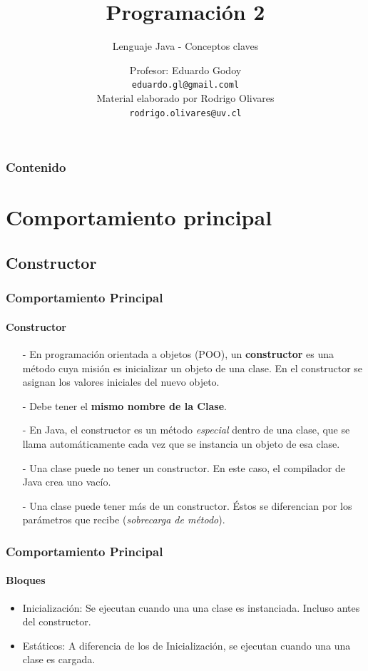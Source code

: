 \documentclass{beamer}
\title[\textbf{Programaci\'on 2}]{\textbf{Programaci\'on 2}}
\subtitle{Lenguaje Java - Conceptos claves}
\author[Eduardo Godoy]
{
	Profesor: Eduardo Godoy \\
	\vspace{0.5mm}
	\texttt{\normalsize eduardo.gl@gmail.coml} \\ 
	Material elaborado por Rodrigo Olivares \\
	\texttt{\normalsize rodrigo.olivares@uv.cl} 
}
\institute[Universidad de Valpara\'iso]
\begin{document}
	\begin{frame}
		\titlepage
	\end{frame}

	\begin{frame}
		\frametitle{Contenido}
		\tableofcontents%
	\end{frame}

    \section{Comportamiento principal}
    
		\subsection{Constructor}

        \begin{frame}
			\frametitle{Comportamiento Principal}
			\framesubtitle{Constructor}

			\begin{block}{}
			    \begin{itemize}
                    \item[-] En programaci\'on orientada a objetos (POO), un \textbf{constructor} es una m\'etodo cuya misi\'on es inicializar un objeto de una clase. En el constructor se asignan los valores iniciales del nuevo objeto.
                    \item[-] Debe tener el \textbf{mismo nombre de la Clase}.
                    \item[-] En Java, el constructor es un m\'etodo \emph{especial} dentro de una clase, que se llama autom\'aticamente cada vez que se instancia un objeto de esa clase.
                    \item[-] Una clase puede no tener un constructor. En este caso, el compilador de Java crea uno vac\'io.
                    \item[-] Una clase puede tener m\'as de un constructor. \'Estos se diferencian por los par\'ametros que recibe (\emph{sobrecarga de m\'etodo}).
                \end{itemize}
			\end{block}
		\end{frame}

        \begin{frame}
			\frametitle{Comportamiento Principal}
			\framesubtitle{Bloques}

			\begin{block}{}
				    \begin{itemize}
                    				\item Inicializaci\'on: Se ejecutan cuando una una clase es instanciada. Incluso antes del constructor.
 					\item Est\'aticos: A diferencia de los de Inicializaci\'on, se ejecutan cuando una una clase es cargada.
				\end{itemize}
			\end{block}
		\end{frame}
\end{document}
